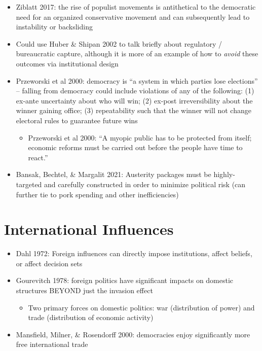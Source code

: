 \documentclass[12pt]{article}
\begin{document}
\begin{itemize}
    \item Ziblatt 2017: the rise of populist movements is antithetical to the democratic need for an organized conservative movement and can subsequently lead to instability or backsliding
    \item Could use Huber \& Shipan 2002 to talk briefly about regulatory / bureaucratic capture, although it is more of an example of how to \emph{avoid} these outcomes via institutional design
    \item Przeworski et al 2000: democracy is ``a system in which parties lose elections'' -- falling from democracy could include violations of any of the following: (1) ex-ante uncertainty about who will win; (2) ex-post irreversibility about the winner gaining office; (3) repeatability such that the winner will not change electoral rules to guarantee future wins
    \begin{itemize}
        \item Przeworski et al 2000: ``A myopic public has to be protected from itself; economic reforms must be carried out before the people have time to react.''
    \end{itemize}
    \item Bansak, Bechtel, \& Margalit 2021: Austerity packages must be highly-targeted and carefully constructed in order to minimize political risk (can further tie to pork spending and other inefficiencies)
\end{itemize}



\section*{International Influences}

\begin{itemize}
    \item Dahl 1972: Foreign influences can directly impose institutions, affect beliefs, or affect decision sets
    \item Gourevitch 1978: foreign politics have significant impacts on domestic structures BEYOND just the invasion effect
    \begin{itemize}
        \item Two primary forces on domestic politics: war (distribution of power) and trade (distribution of economic activity)
    \end{itemize}
    \item Mansfield, Milner, \& Rosendorff 2000: democracies enjoy significantly more free international trade
\end{itemize}
\end{document}

